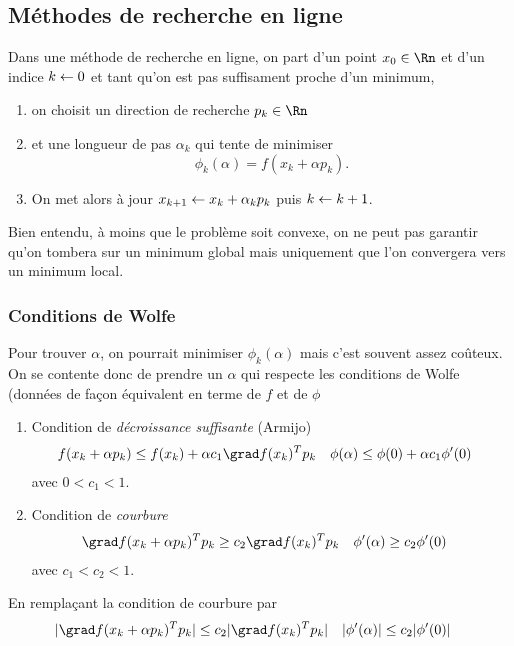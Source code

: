 \subsection{Méthodes de recherche en ligne}
Dans une méthode de recherche en ligne,
on part d'un point $x_0 \in \Rn$ et d'un indice $k \leftarrow 0$ et
tant qu'on est pas suffisament proche d'un minimum,
\begin{enumerate}
  \item on choisit un direction de recherche $p_k \in \Rn$
  \item et une longueur de pas $\alpha_k$ qui tente de minimiser
    \[ \phi_k(\alpha) = f(x_k + \alpha p_k). \]
  \item On met alors à jour $x_{k+1} \leftarrow x_k + \alpha_k p_k$ puis
    $k \leftarrow k + 1$.
\end{enumerate}
Bien entendu, à moins que le problème soit convexe,
on ne peut pas garantir qu'on tombera sur un minimum global mais
uniquement que l'on convergera vers un minimum local.

\subsubsection{Conditions de Wolfe}
Pour trouver $\alpha$,
on pourrait minimiser $\phi_k(\alpha)$ mais c'est souvent assez coûteux.
On se contente donc de prendre un $\alpha$ qui respecte les conditions
de Wolfe (données de façon équivalent en terme de $f$ et de $\phi$
\begin{enumerate}
  \item Condition de \emph{décroissance suffisante} (Armijo)
    \begin{align*}
      f(x_k + \alpha p_k) & \leq f(x_k) + \alpha c_1 \grad f(x_k)^Tp_k &
      \phi(\alpha) & \leq \phi(0) + \alpha c_1 \phi'(0) &
    \end{align*}
    avec $0 < c_1 < 1$.
  \item Condition de \emph{courbure}
    \begin{align*}
      \grad f(x_k + \alpha p_k)^Tp_k & \geq c_2 \grad f(x_k)^Tp_k &
      \phi'(\alpha) & \geq c_2\phi'(0)
    \end{align*}
    avec $c_1 < c_2 < 1$.
\end{enumerate}
En remplaçant la condition de courbure par
\begin{align*}
  |\grad f(x_k + \alpha p_k)^Tp_k| & \leq c_2 |\grad f(x_k)^Tp_k| &
  |\phi'(\alpha)| & \leq c_2|\phi'(0)|
\end{align*}

